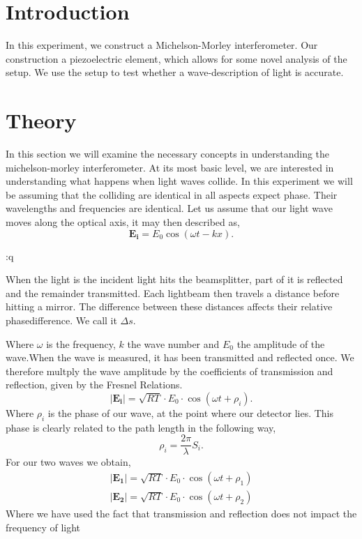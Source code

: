 \documentclass[working, oneside]{inputs/tuftebook}
\begin{document}
\let\cleardoublepage\clearpage
\section*{Introduction}
In this experiment, we construct a Michelson-Morley interferometer. Our construction a piezoelectric element, which allows for some novel analysis of the setup. We use the setup to test whether a wave-description of light is accurate. 
\section*{Theory}
In this section we will examine the necessary concepts in understanding the michelson-morley interferometer. At its most basic level, we are interested in understanding what happens when light waves collide. In this experiment we will be assuming that the colliding are identical in all aspects expect phase. Their wavelengths and frequencies are identical. Let us assume that our light wave moves along the optical axis, it may then described as,
\[
	\bm{E_i} = E_0 \cos\left( \omega t - kx \right) 
.\] 
\begin{marginfigure}:q
    \centering
    \caption{When the light is the incident light hits the beamsplitter, part of it is reflected and the remainder transmitted. Each lightbeam then travels a distance before hitting a mirror. The difference between these distances affects their relative phasedifference. We call it $\Delta s$.}
    \label{fig:fig1}
\end{marginfigure}
Where $\omega$ is the frequency, $k$ the wave number and $E_0$ the amplitude of the wave.When the wave is measured, it has been transmitted and reflected once. We therefore multply the wave amplitude by the coefficients of transmission and reflection, given by the Fresnel Relations.\cite{grif}
 \[
	 \left|\bm{E_i}\right| = \sqrt{RT} \cdot E_0 \cdot \cos\left( \omega t + \rho _i \right) 
.\] 
Where $\rho_i$ is the phase of our wave, at the point where our detector lies. This phase is clearly related to the path length in the following way,
\[
\rho _i  =  \frac{2\pi}{\lambda} S_i
.\]
For our two waves we obtain,
\begin{align*}
	\left|\bm{E_1}\right| = \sqrt{RT} \cdot E_0 \cdot \cos\left( \omega t + \rho _1 \right) \\
	\left|\bm{E_2}\right| = \sqrt{RT} \cdot E_0 \cdot \cos\left( \omega t + \rho _2 \right) 
\end{align*}
Where we have used the fact that transmission and reflection does not impact the frequency of light
\end{document}
